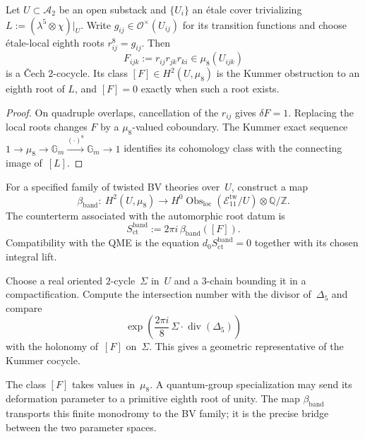 \begin{proposition}
\label{prop:bvbrst-cech-cocycle}
Let $U\subset\mathcal A_2$ be an open substack and
$\{U_i\}$ an étale cover trivializing
$L:=(\lambda^5\otimes\chi)|_U$.  Write $g_{ij}\in
\mathcal O^\times(U_{ij})$ for its transition functions and choose
étale-local eighth roots $r_{ij}^8=g_{ij}$.  Then
\[
 F_{ijk}:=r_{ij}r_{jk}r_{ki}\in\mu_8(U_{ijk})
\]
is a \v Cech $2$-cocycle.  Its class
$[F]\in H^2(U,\mu_8)$ is the Kummer obstruction to an eighth root of
$L$, and $[F]=0$ exactly when such a root exists.
\end{proposition}

\begin{proof}
On quadruple overlaps, cancellation of the $r_{ij}$ gives
$\delta F=1$.  Replacing the local roots changes $F$ by a
$\mu_8$-valued coboundary.  The Kummer exact sequence
$1\to\mu_8\to\mathbb G_m\xrightarrow{(\cdot)^8}\mathbb G_m\to1$
identifies its cohomology class with the connecting image of~$[L]$.
\end{proof}

\begin{conjecture}
\label{prop:bvbrst-banding-counterterm}
For a specified family of twisted BV theories over~$U$, construct a
map
\[
 \beta_{\mathrm{band}}:\ H^2(U,\mu_8)
 \longrightarrow H^0\operatorname{Obs}_{\mathrm{loc}}
      (\mathcal E_{11}^{\mathrm{tw}}/U)\otimes\mathbb Q/\mathbb Z .
\]
The counterterm associated with the automorphic root datum is
\[
 S_{\mathrm{ct}}^{\mathrm{band}}
 :=2\pi i\,\beta_{\mathrm{band}}([F]).
\]
Compatibility with the QME is the equation
$d_0S_{\mathrm{ct}}^{\mathrm{band}}=0$ together with its chosen
integral lift.
\end{conjecture}

\begin{problem}
\label{rem:bvbrst-linking-number}
Choose a real oriented $2$-cycle~$\Sigma$ in~$U$ and a $3$-chain
bounding it in a compactification.  Compute the intersection number
with the divisor of~$\Delta _5$ and compare
\[
 \exp\!\left(\frac{2\pi i}{8}
       \,\Sigma\cdot\operatorname{div}(\Delta _5)\right)
\]
with the holonomy of~$[F]$ on~$\Sigma$.  This gives a geometric
representative of the Kummer cocycle.
\end{problem}

\begin{remark}
\label{rem:bvbrst-two-hbar-banding}
The class $[F]$ takes values in~$\mu_8$.  A quantum-group
specialization may send its deformation parameter to a primitive
eighth root of unity.  The map $\beta_{\mathrm{band}}$ transports this
finite monodromy to the BV family; it is the precise bridge between
the two parameter spaces.
\end{remark}

